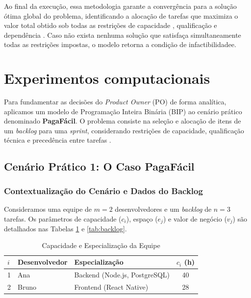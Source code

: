 \documentclass[12pt]{article}
\begin{document}
Ao final da execução, essa metodologia garante a convergência para a solução ótima global do problema, identificando a alocação de tarefas que maximiza o valor total obtido sob todas as restrições de capacidade \cite{kellerer2004}, qualificação \cite{bellenguez2007} e dependência \cite{samphaiboon2000}. Caso não exista nenhuma solução que satisfaça simultaneamente todas as restrições impostas, o modelo retorna a condição de infactibilidadee.




\section{Experimentos computacionais}




Para fundamentar as decisões do \textit{Product Owner} (PO) de forma analítica, aplicamos um modelo de Programação Inteira Binária (BIP) ao cenário prático denominado \textbf{PagaFácil}. O problema consiste na seleção e alocação de itens de um \textit{backlog} para uma \textit{sprint}, considerando restrições de capacidade, qualificação técnica e precedência entre tarefas \cite{wolsey1998}.

\subsection{Cenário Prático 1: O Caso PagaFácil}

\subsubsection{Contextualização do Cenário e Dados do Backlog}

Consideramos uma equipe de $m=2$ desenvolvedores e um \textit{backlog} de $n=3$ tarefas. Os parâmetros de capacidade ($c_i$), espaço ($e_j$) e valor de negócio ($v_j$) são detalhados nas Tabelas \ref{tab:equipe} e \ref{tab:backlog}.

\begin{table}[h]
\centering
\caption{Capacidade e Especialização da Equipe}
\label{tab:equipe}
\begin{tabular}{lllc}
\hline
$i$ & Desenvolvedor & Especialização & $c_i$ (h) \\ \hline
1   & Ana           & Backend (Node.js, PostgreSQL) & 40        \\
2   & Bruno         & Frontend (React Native)       & 28        \\ \hline
\end{tabular}
\end{table}
\end{document}
